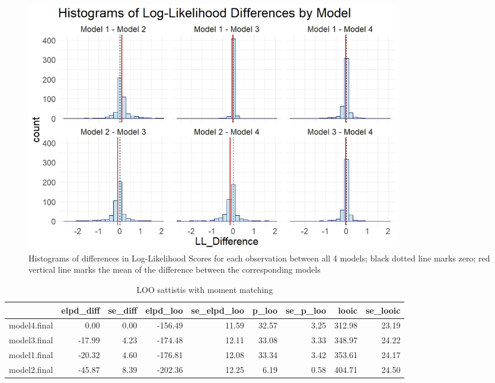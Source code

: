 \documentclass[12pt]{article}
\begin{document}
\begin{figure}[h]
	\centering
	\includegraphics[width=0.8\textwidth]{model_comp_figures/LL_differences.jpeg}
	\caption{Histograms of differences in Log-Likelihood Scores for each observation between all 4 models; black dotted line marks zero; red vertical line marks the mean of the difference between the corresponding models}
	\label{fig:ll_diff}
\end{figure}


%
%
%



\begin{table}[ht]
	\centering
	\begin{tabular}{rrrrrrrrr}
		\hline
		& elpd\_diff & se\_diff & elpd\_loo & se\_elpd\_loo & p\_loo & se\_p\_loo & looic & se\_looic \\ 
		\hline
		model4.final & 0.00 & 0.00 & -156.49 & 11.59 & 32.57 & 3.25 & 312.98 & 23.19 \\ 
		model3.final & -17.99 & 4.23 & -174.48 & 12.11 & 33.08 & 3.33 & 348.97 & 24.22 \\ 
		model1.final & -20.32 & 4.60 & -176.81 & 12.08 & 33.34 & 3.42 & 353.61 & 24.17 \\ 
		model2.final & -45.87 & 8.39 & -202.36 & 12.25 & 6.19 & 0.58 & 404.71 & 24.50 \\ 
		\hline
	\end{tabular}
	\caption{LOO sattistis with moment matching}
\end{table}
\end{document}
